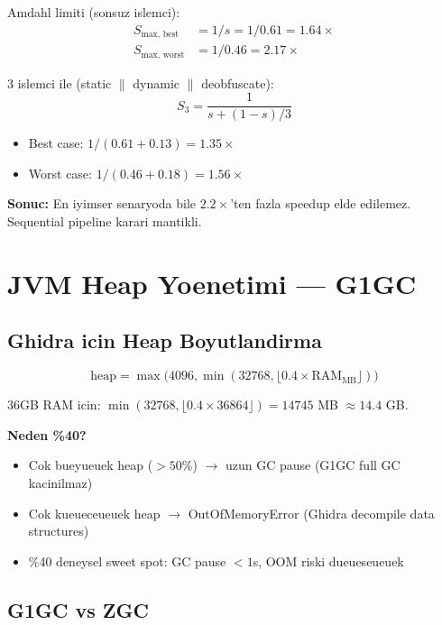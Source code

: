 Amdahl limiti (sonsuz islemci):
\begin{align}
S_{\text{max, best}} &= 1/s = 1/0.61 = 1.64\times \\
S_{\text{max, worst}} &= 1/0.46 = 2.17\times
\end{align}

3 islemci ile (static $\|$ dynamic $\|$ deobfuscate):
\begin{equation}
S_3 = \frac{1}{s + (1-s)/3}
\end{equation}

\begin{itemize}
\item Best case: $1/(0.61 + 0.13) = 1.35\times$
\item Worst case: $1/(0.46 + 0.18) = 1.56\times$
\end{itemize}

\textbf{Sonuc:} En iyimser senaryoda bile $2.2\times$'ten fazla speedup elde edilemez. Sequential pipeline karari mantikli.


\section{JVM Heap Yoenetimi --- G1GC}
\label{sec:jvm-deep}

\subsection{Ghidra icin Heap Boyutlandirma}

\begin{equation}
\text{heap} = \max\!\big(4096, \min(32768, \lfloor 0.4 \times \text{RAM}_{\text{MB}} \rfloor)\big)
\end{equation}

36GB RAM icin: $\min(32768, \lfloor 0.4 \times 36864 \rfloor) = 14745$ MB $\approx 14.4$ GB.

\textbf{Neden \%40?}
\begin{itemize}
\item Cok bueyueuek heap ($> 50\%$) $\to$ uzun GC pause (G1GC full GC kacinilmaz)
\item Cok kueueceueuek heap $\to$ OutOfMemoryError (Ghidra decompile data structures)
\item \%40 deneysel sweet spot: GC pause $< 1$s, OOM riski dueueseueuek
\end{itemize}

\subsection{G1GC vs ZGC}

